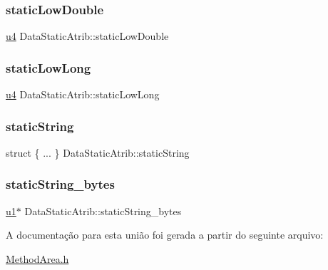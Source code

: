 \subsubsection{\texorpdfstring{static\+Low\+Double}{staticLowDouble}}
{\footnotesize\ttfamily \hyperlink{ClassLoader_8h_aedf6ddc03df8caaaccbb4c60b9a9b850}{u4} Data\+Static\+Atrib\+::static\+Low\+Double}

\mbox{\label{unionDataStaticAtrib_aa04959b5aa4875d47c56624692ce0bb3}} 
\subsubsection{\texorpdfstring{static\+Low\+Long}{staticLowLong}}
{\footnotesize\ttfamily \hyperlink{ClassLoader_8h_aedf6ddc03df8caaaccbb4c60b9a9b850}{u4} Data\+Static\+Atrib\+::static\+Low\+Long}

\mbox{\label{unionDataStaticAtrib_a74a2c8f98d0cc1708e4a97050c73ed3f}} 
\subsubsection{\texorpdfstring{static\+String}{staticString}}
{\footnotesize\ttfamily struct \{ ... \}  Data\+Static\+Atrib\+::static\+String}

\mbox{\label{unionDataStaticAtrib_ab578dc394ef2a6b255e56724317bfb0a}} 
\subsubsection{\texorpdfstring{static\+String\+\_\+bytes}{staticString\_bytes}}
{\footnotesize\ttfamily \hyperlink{ClassLoader_8h_a216a9f8b04b4f0af84a4ca9d1d85a6ca}{u1}$\ast$ Data\+Static\+Atrib\+::static\+String\+\_\+bytes}



A documentação para esta união foi gerada a partir do seguinte arquivo\+:\begin{DoxyCompactItemize}
\item 
\hyperlink{MethodArea_8h}{Method\+Area.\+h}\end{DoxyCompactItemize}
